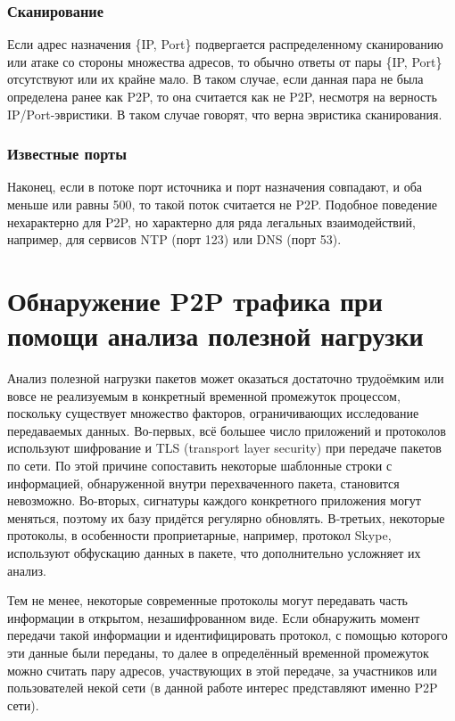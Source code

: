 \documentclass[bachelor, och, coursework]{SCWorks}
\begin{document}
\subsubsection{Сканирование}
Если адрес назначения \{IP, Port\} подвергается распределенному сканированию или атаке со
стороны множества адресов, то обычно ответы от пары \{IP, Port\} отсутствуют или их крайне мало. В таком случае, если данная пара не была определена ранее как P2P, то она считается как не P2P, несмотря на верность IP/Port-эвристики. В таком случае говорят, что верна эвристика сканирования.

\subsubsection{Известные порты}
Наконец, если в потоке порт источника и порт назначения совпадают, и оба меньше или равны 500, то такой поток считается не P2P. Подобное поведение нехарактерно для P2P, но характерно для ряда легальных взаимодействий, например, для сервисов NTP (порт 123) или DNS (порт 53). 

\section{Обнаружение P2P трафика при помощи анализа полезной нагрузки}
Анализ полезной нагрузки пакетов может оказаться достаточно трудоёмким или вовсе не реализуемым в конкретный временной промежуток процессом, поскольку существует множество факторов, ограничивающих исследование передаваемых данных. Во-первых, всё большее число приложений и протоколов используют шифрование и TLS (transport layer security) при передаче пакетов по сети. По этой причине сопоставить некоторые шаблонные строки с информацией, обнаруженной внутри перехваченного пакета, становится невозможно. Во-вторых, сигнатуры каждого конкретного приложения могут меняться, поэтому их базу придётся регулярно обновлять. В-третьих, некоторые протоколы, в особенности проприетарные, например, протокол Skype, используют обфускацию данных в пакете, что дополнительно усложняет их анализ. 

Тем не менее, некоторые современные протоколы могут передавать часть информации в открытом, незашифрованном виде. Если обнаружить момент передачи такой информации и идентифицировать протокол, с помощью которого эти данные были переданы, то далее в определённый временной промежуток можно считать пару адресов, участвующих в этой передаче, за участников или пользователей некой сети (в данной работе интерес представляют именно P2P сети).
\end{document}
